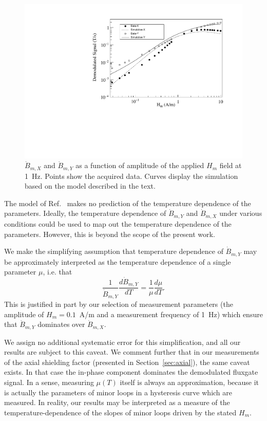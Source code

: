 \begin{figure}[h!]
  \begin{center}
    \includegraphics[width=\textwidth]{Jiles_and_data.pdf}
    \caption{$\dot{B}_{m,X}$ and $\dot{B}_{m,Y}$ as a function of
      amplitude of the applied $H_m$ field at 1~Hz.  Points show the
      acquired data.  Curves display the simulation based on the model
      described in the text.}
    \label{fig:data_and_simulation}
  \end{center}
\end{figure} 

The model of Ref.~\cite{jiles1994frequency} makes no prediction of the
temperature dependence of the parameters.  Ideally, the temperature
dependence of $\dot{B}_{m,Y}$ and $\dot{B}_{m,X}$ under various
conditions could be used to map out the temperature dependence of the
parameters.  However, this is beyond the scope of the present work.

We make the simplifying assumption that temperature dependence of
$\dot{B}_{m,Y}$ may be approximately interpreted as the temperature
dependence of a single parameter $\mu$, i.e. that
\begin{equation}
\frac{1}{\dot{B}_{m,Y}}\frac{d\dot{B}_{m,Y}}{dT}=\frac{1}{\mu}\frac{d\mu}{dT}.
\end{equation}
This is justified in part by our selection of measurement parameters
(the amplitude of $H_m=0.1$~A/m and a measurement frequency of 1~Hz)
which ensure that $\dot{B}_{m,Y}$ dominates over $\dot{B}_{m,X}$.

We assign no additional systematic error for this simplification, and
all our results are subject to this caveat.  We comment further that
in our measurements of the axial shielding factor (presented in
Section~\ref{sec:axial}), the same caveat exists.  In that case the
in-phase component dominates the demodulated fluxgate signal.  In a
sense, measuring $\mu(T)$ itself is always an approximation, because
it is actually the parameters of minor loops in a hysteresis curve
which are measured.  In reality, our results may be interpreted as a
measure of the temperature-dependence of the slopes of minor loops
driven by the stated $H_m$.

